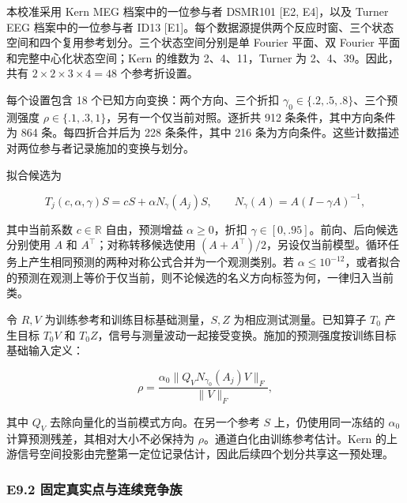 \documentclass[11pt,a4paper]{article}
\begin{document}
本校准采用 Kern MEG 档案中的一位参与者 DSMR101 {[}E2, E4{]}，以及 Turner
EEG 档案中的一位参与者 ID13
{[}E1{]}。每个数据源提供两个反应时窗、三个状态空间和四个复用参考划分。三个状态空间分别是单
Fourier 平面、双 Fourier 平面和完整中心化状态空间；Kern 的维数为
2、4、11，Turner 为 2、4、39。因此，共有 \(2\times2\times3\times4=48\)
个参考折设置。

每个设置包含 18 个已知方向变换：两个方向、三个折扣
\(\gamma_0\in\{.2,.5,.8\}\)、三个预测强度
\(\rho\in\{.1,.3,1\}\)，另有一个仅当前对照。逐折共 912
条条件，其中方向条件为 864 条。每四折合并后为 228 条条件，其中 216
条为方向条件。这些计数描述对两位参与者记录施加的变换与划分。

\par
\noindent\begin{minipage}{\linewidth}

拟合候选为

\[
T_j(c,\alpha,\gamma)S=cS+\alpha N_\gamma(A_j)S,
\qquad N_\gamma(A)=A(I-\gamma A)^{-1},
\]

\end{minipage}\par

其中当前系数 \(c\in\mathbb R\) 自由，预测增益 \(\alpha\geq0\)，折扣
\(\gamma\in[0,.95]\)。前向、后向候选分别使用 \(A\) 和
\(A^\top\)；对称转移候选使用
\((A+A^\top)/2\)，另设仅当前模型。循环任务上产生相同预测的两种对称公式合并为一个观测类别。若
\(\alpha\leq10^{-12}\)，或者拟合的预测在观测上等价于仅当前，则不论候选的名义方向标签为何，一律归入当前类。

\par
\noindent\begin{minipage}{\linewidth}

令 \(R,V\) 为训练参考和训练目标基础测量，\(S,Z\)
为相应测试测量。已知算子 \(T_0\) 产生目标 \(T_0V\) 和
\(T_0Z\)，信号与测量波动一起接受变换。施加的预测强度按训练目标基础输入定义：

\[
\rho=\frac{\alpha_0\|Q_VN_{\gamma_0}(A_j)V\|_F}{\|V\|_F},
\]

\end{minipage}\par

其中 \(Q_V\) 去除向量化的当前模式方向。在另一个参考 \(S\)
上，仍使用同一冻结的 \(\alpha_0\) 计算预测残差，其相对大小不必保持为
\(\rho\)。通道白化由训练参考估计。Kern
的上游信号空间投影由完整第一定位记录估计，因此后续四个划分共享这一预处理。

\subsubsection{E9.2
固定真实点与连续竞争族}\label{e9.2-ux56faux5b9aux771fux5b9eux70b9ux4e0eux8fdeux7eedux7adeux4e89ux65cf}
\end{document}
